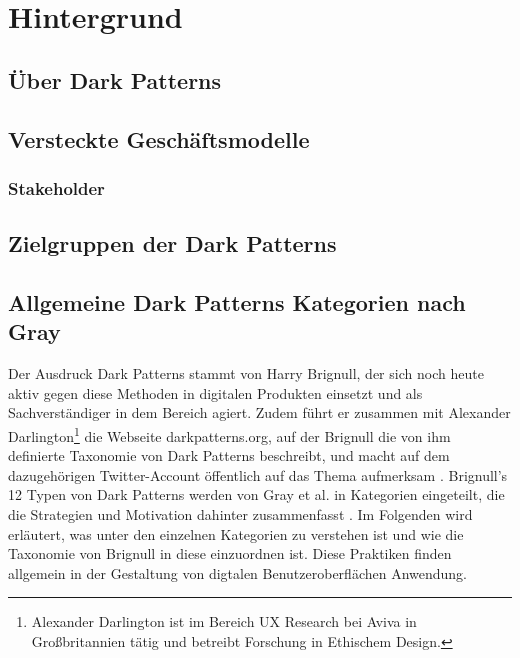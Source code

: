 \documentclass[a4paper]{article}
\begin{document}
\section{Hintergrund}
\label{sec:hintergrund}


\subsection{Über Dark Patterns} 
\label{sub:die_hintergruende_der_dark_patterns}


\subsection{Versteckte Geschäftsmodelle} 
\label{sub:versteckte_geschaeftsmodelle}


\subsubsection{Stakeholder}
\label{sub:stakeholder}


\subsection{Zielgruppen der Dark Patterns} 
\label{sub:zielgruppen_der_dark_patterns}


\subsection{Allgemeine Dark Patterns Kategorien nach Gray}
\label{sub:dark_patterns_kategorien}
Der Ausdruck \glqq Dark Patterns\grqq{} stammt von Harry Brignull, der sich noch heute aktiv gegen diese Methoden in digitalen Produkten einsetzt und als Sachverständiger in dem Bereich agiert. Zudem führt er zusammen mit Alexander Darlington\footnote{\label{foot:2} Alexander Darlington ist im Bereich UX Research bei Aviva in Großbritannien tätig und betreibt Forschung in Ethischem Design.} die Webseite darkpatterns.org, auf der Brignull die von ihm definierte Taxonomie von Dark Patterns beschreibt, und macht auf dem dazugehörigen Twitter-Account öffentlich auf das Thema aufmerksam \cite{brignull3}\cite{brignull4}. Brignull's 12 Typen von Dark Patterns werden von Gray et al. in Kategorien eingeteilt, die die Strategien und Motivation dahinter zusammenfasst \cite{gray}. 
Im Folgenden wird erläutert, was unter den einzelnen Kategorien zu verstehen ist und wie die Taxonomie von Brignull in diese einzuordnen ist. Diese Praktiken finden allgemein in der Gestaltung von digtalen Benutzeroberflächen Anwendung.
\end{document}
